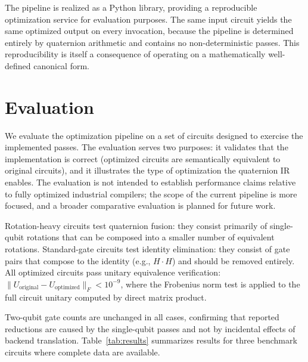 \documentclass[conference]{IEEEtran}
\begin{document}
The pipeline is realized as a Python library, providing a reproducible
optimization service for evaluation purposes. The same input circuit yields the same
optimized output on every invocation, because the pipeline is determined entirely by
quaternion arithmetic and contains no non-deterministic passes. This reproducibility is
itself a consequence of operating on a mathematically well-defined canonical form.

\section{Evaluation}

We evaluate the optimization pipeline on a set of circuits designed to exercise the
implemented passes. The evaluation serves two purposes: it validates that the
implementation is correct (optimized circuits are semantically equivalent to original
circuits), and it illustrates the type of optimization the quaternion IR enables. The
evaluation is not intended to establish performance claims relative to fully optimized
industrial compilers; the scope of the current pipeline is more focused, and a broader
comparative evaluation is planned for future work.

Rotation-heavy circuits test quaternion fusion: they consist primarily of single-qubit
rotations that can be composed into a smaller number of equivalent rotations. Standard-gate
circuits test identity elimination: they consist of gate pairs that compose to the identity
(e.g., $H \cdot H$) and should be removed entirely. All optimized circuits pass unitary
equivalence verification: $\|U_{\text{original}} - U_{\text{optimized}}\|_F < 10^{-9}$,
where the Frobenius norm test is applied to the full circuit unitary computed by direct
matrix product.

Two-qubit gate counts are unchanged in all cases, confirming that reported reductions
are caused by the single-qubit passes and not by incidental effects of backend translation.
Table~\ref{tab:results} summarizes results for three benchmark circuits where complete data
are available.
\end{document}
